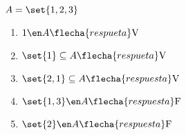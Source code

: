 \ejercicio
$A = \set{1,2,3}$
\begin{multicols}{2}
	\begin{enumerate}[label=(\roman*)]
		\item $1 \en A \flecha{respueta} \text{V}$
		\item $\set{1} \subseteq A \flecha{respueta} \text{V}$
		\item $\set{2,1} \subseteq A \flecha{respuesta} \text{V}$
		\item $\set{1,3} \en A \flecha{respuesta} \text{F}$
		\item $\set{2} \en A \flecha{respuesta} \text{F}$
	\end{enumerate}
\end{multicols}


